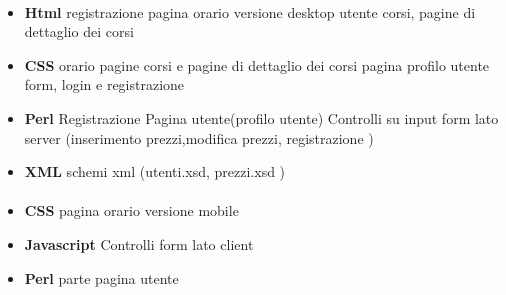\documentclass[12pt,a4paper]{article}
\begin{document}
\paragraph{\AB{}}
\begin{itemize}
	\item \textbf{Html}
	\subitem registrazione
	\subitem pagina orario versione desktop
	\subitem utente
	\subitem corsi, pagine di dettaglio dei corsi
	\item \textbf{CSS}
	\subitem orario
	\subitem pagine corsi e pagine di dettaglio dei corsi
	\subitem pagina profilo utente
	\subitem form, login e registrazione
	\item \textbf{Perl}
	\subitem Registrazione
	\subitem Pagina utente(profilo utente)
	\subitem Controlli su input form lato server (inserimento prezzi,modifica prezzi, registrazione )
	\item\textbf{XML}
	\subitem schemi xml (utenti.xsd, prezzi.xsd )

\end{itemize}
\paragraph{\EC{}}
\begin{itemize}
	\item\textbf{CSS}
	\subitem pagina orario versione mobile
	\item\textbf{Javascript}
	\subitem Controlli form lato client
	\item\textbf{ Perl}
	\subitem parte pagina utente
\end{itemize}
\end{document}
